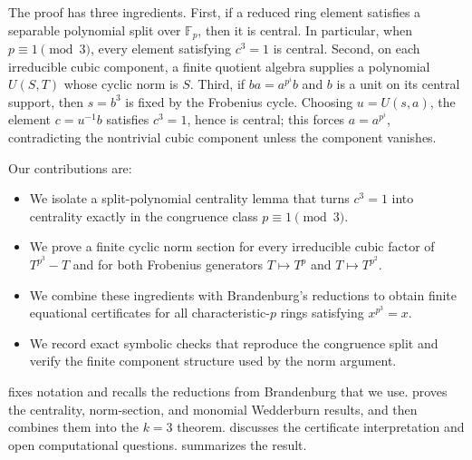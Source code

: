 The proof has three ingredients.  First, if a reduced ring element satisfies a separable polynomial split over \(\mathbb F_p\), then it is central.  In particular, when \(p\equiv 1 \pmod 3\), every element satisfying \(c^3=1\) is central.  Second, on each irreducible cubic component, a finite quotient algebra supplies a polynomial \(U(S,T)\) whose cyclic norm is \(S\).  Third, if \(b a=a^{p^i}b\) and \(b\) is a unit on its central support, then \(s=b^3\) is fixed by the Frobenius cycle.  Choosing \(u=U(s,a)\), the element \(c=u^{-1}b\) satisfies \(c^3=1\), hence is central; this forces \(a=a^{p^i}\), contradicting the nontrivial cubic component unless the component vanishes.

Our contributions are:
\begin{itemize}[leftmargin=*]
  \item We isolate a split-polynomial centrality lemma that turns \(c^3=1\) into centrality exactly in the congruence class \(p\equiv 1 \pmod 3\).
  \item We prove a finite cyclic norm section for every irreducible cubic factor of \(T^{p^3}-T\) and for both Frobenius generators \(T\mapsto T^p\) and \(T\mapsto T^{p^2}\).
  \item We combine these ingredients with Brandenburg's reductions to obtain finite equational certificates for all characteristic-\(p\) rings satisfying \(x^{p^3}=x\).
  \item We record exact symbolic checks that reproduce the congruence split and verify the finite component structure used by the norm argument.
\end{itemize}

 fixes notation and recalls the reductions from Brandenburg that we use.   proves the centrality, norm-section, and monomial Wedderburn results, and then combines them into the \(k=3\) theorem.   discusses the certificate interpretation and open computational questions.   summarizes the result.
